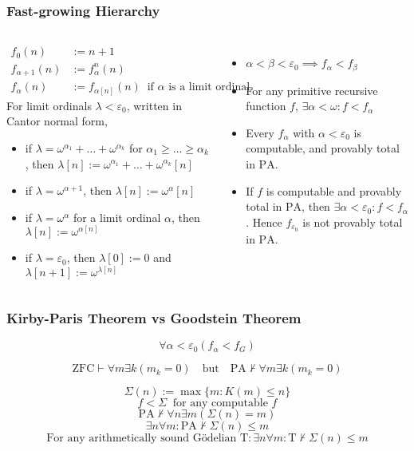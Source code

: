 \documentclass[UTF8,aspectratio=43,11pt,colorlinks,compress,openany]{beamer}%
\begin{document}
\begin{frame}\frametitle{Fast-growing Hierarchy}
\setlength\abovedisplayskip{0pt}
	\begin{columns}[onlytextwidth]
			\begin{definition}
				\begin{align*}
				f_{0}(n)&:=n+1\\
				f_{{\alpha +1}}(n)&:=f_{\alpha }^{n}(n)\\
				f_{\alpha }(n)&:=f_{{\alpha [n]}}(n)\;\;\text{if $\alpha$ is a limit ordinal.}
				\end{align*}
				For limit ordinals $\lambda<\varepsilon_0$, written in Cantor normal form,
				\begin{itemize}
					\item if $\lambda=\omega^{\alpha_1}+\dots+\omega^{\alpha_k}$ for $\alpha_1\geq\dots\geq\alpha_k$, then $\lambda[n]:=\omega^{\alpha_1}+\dots+\omega^{\alpha_k}[n]$
					\item if $\lambda=\omega^{\alpha+1}$, then $\lambda[n]:=\omega^\alpha[n]$
					\item if $\lambda=\omega^\alpha$ for a limit ordinal $\alpha$, then $\lambda[n]:=\omega^{\alpha[n]}$
					\item if $\lambda=\varepsilon_0$, then $\lambda[0]:=0$ and $\lambda[n+1]:=\omega^{\lambda[n]}$
				\end{itemize}
			\end{definition}
			\begin{itemize}
				\item $\alpha<\beta<\varepsilon_0\implies f_\alpha<f_\beta$
				\item For any primitive recursive function $f$, $\exists\alpha<\omega: f<f_\alpha$
				\item Every $f_\alpha$ with $\alpha<\varepsilon_0$ is computable, and provably total in $\mathrm{PA} $.
				\item If $f$ is computable and provably total in $\mathrm{PA} $, then $\exists\alpha<\varepsilon_0: f<f_\alpha$. Hence $f_{\varepsilon_0}$ is not provably total in $\mathrm{PA} $.
			\end{itemize}
	\end{columns}
\end{frame}

\begin{frame}\frametitle{Kirby-Paris Theorem vs Goodstein Theorem}
	\begin{theorem}
		\[\forall \alpha<\varepsilon_0\left(f_\alpha<f_G\right)\]
	\end{theorem}
	\begin{block}{}
		\[\mathrm{ZFC}\vdash\forall m\exists k(m_k=0)\quad
		\text{but}\quad \mathrm{PA} \nvdash\forall m\exists k(m_k=0)\]
	\end{block}
	\[\Sigma(n):=\max\{m: K(m)\leq n\}\]
	\[f<\Sigma\;\;\text{for any computable $f$}\]
	\[\mathrm{PA} \nvdash\forall n\exists m(\Sigma(n)=m)\]
	\[\exists n\forall m: \mathrm{PA} \nvdash\Sigma(n)\leq m\]
	\[\text{For any arithmetically sound G\"odelian $\mathrm{T}$}: \exists n\forall m: \mathrm{T}\nvdash\Sigma(n)\leq m\]
\end{frame}
\end{document}

